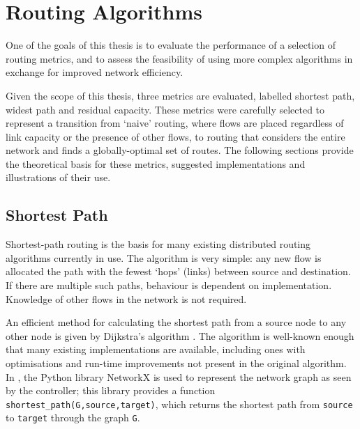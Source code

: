 \chapter{Routing Algorithms}
One of the goals of this thesis is to evaluate the performance of a selection of routing metrics, and to assess the feasibility of using more complex algorithms in exchange for improved network efficiency.

Given the scope of this thesis, three metrics are evaluated, labelled shortest path, widest path and residual capacity. These metrics were carefully selected to represent a transition from `naive' routing, where flows are placed regardless of link capacity or the presence of other flows, to routing that considers the entire network and finds a globally-optimal set of routes. The following sections provide the theoretical basis for these metrics, suggested implementations and illustrations of their use.

\section{Shortest Path}
Shortest-path routing is the basis for many existing distributed routing algorithms currently in use. The algorithm is very simple: any new flow is allocated the path with the fewest `hops' (links) between source and destination. If there are multiple such paths, behaviour is dependent on implementation. Knowledge of other flows in the network is not required.

An efficient method for calculating the shortest path from a source node to any other node is given by Dijkstra's algorithm \cite[pp. 684--693]{cormen:algorithms}. The algorithm is well-known enough that many existing implementations are available, including ones with optimisations and run-time improvements not present in the original algorithm. In \thesis{}, the Python library NetworkX \cite{networkx} is used to represent the network graph as seen by the controller; this library provides a function \texttt{shortest\_path(G,source,target)}, which returns the shortest path from \texttt{source} to \texttt{target} through the graph \texttt{G}.

